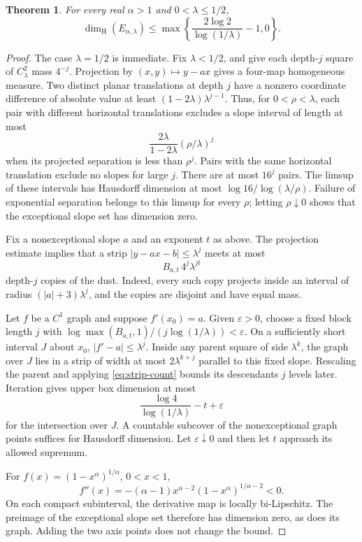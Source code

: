 \documentclass[11pt,a4paper]{amsart}
\numberwithin{equation}{section}
\newtheorem{theorem}{Theorem}[section]
\theoremstyle{definition}
\begin{document}
\begin{theorem}\label{thm:dimension-upper}
For every real \(\alpha>1\) and \(0<\lambda\leq1/2\),
\[
\dim_{\mathrm H}(E_{\alpha,\lambda})\leq
\max\left\{\frac{2\log2}{\log(1/\lambda)}-1,0\right\}.
\]
\end{theorem}
\begin{proof}
The case \(\lambda=1/2\) is immediate. Fix \(\lambda<1/2\), and
give each depth-\(j\) square of \(C_\lambda^2\) mass \(4^{-j}\).
Projection by \((x,y)\mapsto y-ax\) gives a four-map homogeneous
measure. Two distinct planar translations at depth \(j\) have a
nonzero coordinate difference of absolute value at least
\((1-2\lambda)\lambda^{j-1}\). Thus, for \(0<\rho<\lambda\), each pair
with different horizontal translations excludes a slope interval
of length at most
\[
\frac{2\lambda}{1-2\lambda}(\rho/\lambda)^j
\]
when its projected separation is less than \(\rho^j\).
Pairs with the same horizontal translation exclude no slopes for
large \(j\). There are at most \(16^j\) pairs. The limsup of these
intervals has Hausdorff dimension at most
\(\log16/\log(\lambda/\rho)\). Failure of exponential separation
belongs to this limsup for every \(\rho\); letting \(\rho\downarrow0\)
shows that the exceptional slope set has dimension zero.

Fix a nonexceptional slope \(a\) and an exponent \(t\) as above.
The projection estimate implies that a strip
\(\lvert y-ax-b\rvert\leq\lambda^j\) meets at most
\begin{equation}
B_{a,t}\,4^j\lambda^{jt}
\label{eq:strip-count}
\end{equation}
depth-\(j\) copies of the dust. Indeed, every such copy projects
inside an interval of radius \((|a|+3)\lambda^j\), and the copies
are disjoint and have equal mass.

Let \(f\) be a \(C^1\) graph and suppose \(f'(x_0)=a\).
Given \(\varepsilon>0\), choose a fixed block length \(j\) with
\(\log\max(B_{a,t},1)/(j\log(1/\lambda))<\varepsilon\).
On a sufficiently short interval \(J\) about \(x_0\),
\(\lvert f'-a\rvert\leq\lambda^j\).
Inside any parent square of side \(\lambda^k\), the graph over
\(J\) lies in a strip of width at most \(2\lambda^{k+j}\)
parallel to this fixed slope. Rescaling the parent and applying
\eqref{eq:strip-count} bounds its descendants \(j\) levels later.
Iteration gives upper box dimension at most
\[
\frac{\log4}{\log(1/\lambda)}-t+\varepsilon
\]
for the intersection over \(J\). A countable subcover of the
nonexceptional graph points suffices for Hausdorff dimension.
Let \(\varepsilon\downarrow0\) and then let \(t\) approach its
allowed supremum.

For \(f(x)=(1-x^\alpha)^{1/\alpha}\), \(0<x<1\),
\[
f''(x)=-(\alpha-1)x^{\alpha-2}(1-x^\alpha)^{1/\alpha-2}<0.
\]
On each compact subinterval, the derivative map is locally
bi-Lipschitz. The preimage of the exceptional slope set therefore
has dimension zero, as does its graph. Adding the two axis points
does not change the bound.
\end{proof}
\end{document}
